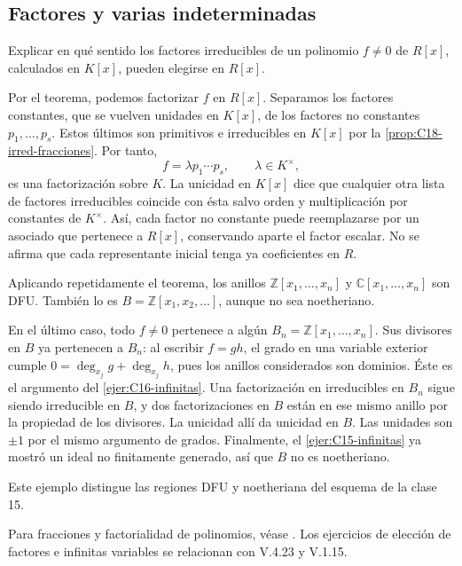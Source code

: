 \subsection{Factores y varias indeterminadas}
\begin{ejer}\label{ejer:C18-elegir-factores}
Explicar en qué sentido los factores irreducibles de un polinomio $f\ne0$ de $R[x]$, calculados en $K[x]$, pueden elegirse en $R[x]$.
\end{ejer}
\begin{sol}
Por el teorema, podemos factorizar $f$ en $R[x]$. Separamos los factores constantes, que se vuelven unidades en $K[x]$, de los factores no constantes $p_1,\ldots,p_s$. Estos últimos son primitivos e irreducibles en $K[x]$ por la \cref{prop:C18-irred-fracciones}. Por tanto,
\[
f=\lambda p_1\cdots p_s,\qquad \lambda\in K^\times,
\]
es una factorización sobre $K$. La unicidad en $K[x]$ dice que cualquier otra lista de factores irreducibles coincide con ésta salvo orden y multiplicación por constantes de $K^\times$. Así, cada factor no constante puede reemplazarse por un asociado que pertenece a $R[x]$, conservando aparte el factor escalar. No se afirma que cada representante inicial tenga ya coeficientes en $R$.
\end{sol}

\begin{ejem}
Aplicando repetidamente el teorema, los anillos $\mathbb Z[x_1,\ldots,x_n]$ y $\mathbb C[x_1,\ldots,x_n]$ son DFU. También lo es $B=\mathbb Z[x_1,x_2,\ldots]$, aunque no sea noetheriano.

En el último caso, todo $f\ne0$ pertenece a algún $B_n=\mathbb Z[x_1,\ldots,x_n]$. Sus divisores en $B$ ya pertenecen a $B_n$: al escribir $f=gh$, el grado en una variable exterior cumple $0=\deg_{x_j}g+\deg_{x_j}h$, pues los anillos considerados son dominios. Éste es el argumento del \cref{ejer:C16-infinitas}. Una factorización en irreducibles en $B_n$ sigue siendo irreducible en $B$, y dos factorizaciones en $B$ están en ese mismo anillo por la propiedad de los divisores. La unicidad allí da unicidad en $B$. Las unidades son $\pm1$ por el mismo argumento de grados. Finalmente, el \cref{ejer:C15-infinitas} ya mostró un ideal no finitamente generado, así que $B$ no es noetheriano.
\end{ejem}
Este ejemplo distingue las regiones DFU y noetheriana del esquema de la clase 15.

\begin{obs}
Para fracciones y factorialidad de polinomios, véase \citet[cap.~V, 4.10--18]{aluffi2009}. Los ejercicios de elección de factores e infinitas variables se relacionan con V.4.23 y V.1.15.
\end{obs}
